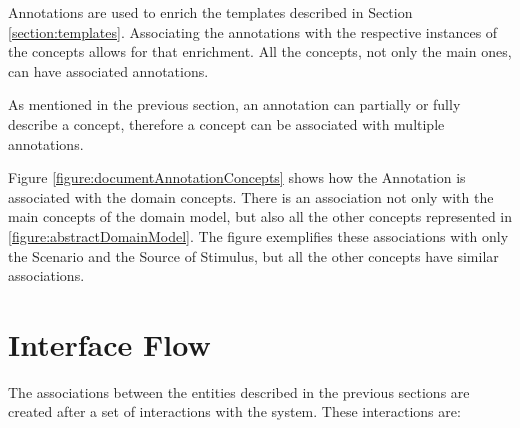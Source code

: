 Annotations are used to enrich the templates described in Section \ref{section:templates}. Associating the annotations with the respective instances of the concepts allows for that enrichment. All the concepts, not only the main ones, can have associated annotations.

As mentioned in the previous section, an annotation can partially or fully describe a concept, therefore a concept can be associated with multiple annotations. 

Figure \ref{figure:documentAnnotationConcepts} shows how the Annotation is associated with the domain concepts. There is an association not only with the main concepts of the domain model, but also all the other concepts represented in \ref{figure:abstractDomainModel}. The figure exemplifies these associations with only the Scenario and the Source of Stimulus, but all the other concepts have similar associations.  

\section{Interface Flow}
\label{section:interfaceFlow}

The associations between the entities described in the previous sections are created after a set of interactions with the system. These interactions are:

